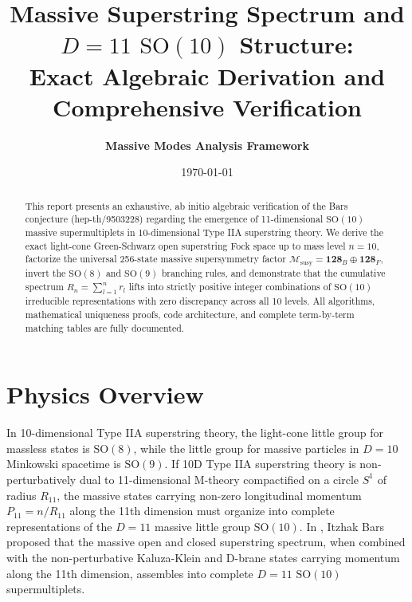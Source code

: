 \documentclass[11pt,a4paper]{article}
\title{\textbf{Massive Superstring Spectrum and $D=11$ $\mathrm{SO}(10)$ Structure:\\ Exact Algebraic Derivation and Comprehensive Verification}}
\author{\textbf{Massive Modes Analysis Framework}}
\date{\today}
\begin{document}
\maketitle

\begin{abstract}
This report presents an exhaustive, ab initio algebraic verification of the Bars conjecture (hep-th/9503228) regarding the emergence of 11-dimensional $\mathrm{SO}(10)$ massive supermultiplets in 10-dimensional Type IIA superstring theory. We derive the exact light-cone Green-Schwarz open superstring Fock space up to mass level $n=10$, factorize the universal 256-state massive supersymmetry factor $\mathcal{M}_{\text{susy}} = \mathbf{128}_B \oplus \mathbf{128}_F$, invert the $\mathrm{SO}(8)$ and $\mathrm{SO}(9)$ branching rules, and demonstrate that the cumulative spectrum $R_n = \sum_{l=1}^n r_l$ lifts into strictly positive integer combinations of $\mathrm{SO}(10)$ irreducible representations with zero discrepancy across all 10 levels. All algorithms, mathematical uniqueness proofs, code architecture, and complete term-by-term matching tables are fully documented.
\end{abstract}

\tableofcontents
\newpage

\section{Physics Overview}
\label{sec:physics}
In 10-dimensional Type IIA superstring theory, the light-cone little group for massless states is $\mathrm{SO}(8)$, while the little group for massive particles in $D=10$ Minkowski spacetime is $\mathrm{SO}(9)$. If 10D Type IIA superstring theory is non-perturbatively dual to 11-dimensional M-theory compactified on a circle $S^1$ of radius $R_{11}$, the massive states carrying non-zero longitudinal momentum $P_{11} = n/R_{11}$ along the 11th dimension must organize into complete representations of the $D=11$ massive little group $\mathrm{SO}(10)$.
In \cite{Bars1995}, Itzhak Bars proposed that the massive open and closed superstring spectrum, when combined with the non-perturbative Kaluza-Klein and D-brane states carrying momentum along the 11th dimension, assembles into complete $D=11$ $\mathrm{SO}(10)$ supermultiplets.
\end{document}
